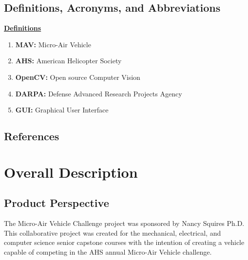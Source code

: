 \documentclass[letterpaper, 10, draftclsnofoot, onecolumn]{IEEEtran}
\begin{document}
\subsection{Definitions, Acronyms, and Abbreviations}

\underline{\textbf{Definitions}}
\begin{enumerate}
\item \textbf{MAV: } Micro-Air Vehicle
\item \textbf{AHS: } American Helicopter Society
\item \textbf{OpenCV: } Open source Computer Vision
\item \textbf{DARPA: } Defense Advanced Research Projects Agency
\item \textbf{GUI: } Graphical User Interface

\end{enumerate}


\subsection{References}




\section{Overall Description}

\subsection{Product Perspective}
\indent The Micro-Air Vehicle Challenge project was sponsored by Nancy Squires Ph.D. This collaborative project was created for the mechanical, electrical, and computer science senior capstone courses with the intention of creating a vehicle capable of competing in the AHS annual Micro-Air Vehicle challenge. 
\end{document}
